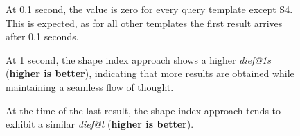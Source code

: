 \begin{figure}
    \centering
    
    \caption{At 0.1 second, the value is zero for every query template except S4. This is expected, as for all other templates the first result arrives after 0.1 seconds.}
    \label{fig:dief_01}
\end{figure}

\begin{figure}
    \centering
    
    \caption{At 1 second, the shape index approach shows a higher \textit{dief@1s} (\textbf{higher is better}), indicating that more results are obtained while maintaining a seamless flow of thought.}
    \label{fig:dief_1}
\end{figure}


\begin{figure}
    \centering
    
    \caption{At the time of the last result, the shape index approach tends to exhibit a similar \textit{dief@t} (\textbf{higher is better}).}
    \label{fig:dief_lr}
\end{figure}

